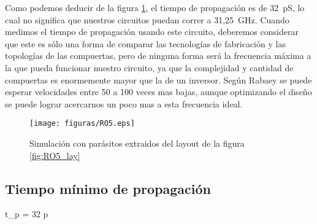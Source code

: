 Como podemos deducir de la figura \ref{fig:RO5_wf}, el tiempo de propagación es de 32~pS, lo cual no significa que nuestros circuitos puedan correr a 31,25~GHz. Cuando medimos el tiempo de propagación usando este circuito, deberemos considerar que este es sólo una forma de comparar las tecnologías de fabricación y las topologías de las compuertas, pero de ninguna forma será la frecuencia máxima a la que pueda funcionar nuestro circuito, ya que la complejidad y cantidad de compuertas es enormemente mayor que la de un inversor. Según Rabaey\cite{rabaey2003} se puede esperar velocidades entre 50 a 100 veces mas bajas, aunque optimizando el diseño se puede lograr acercarnos un poco mas a esta frecuencia ideal. 

\begin{figure}[h!]
\vspace{-5pt}
  \centering
\texttt{[image: figuras/RO5.eps]}
  \caption{Simulación con parásitos extraidos del layout de la figura \ref{fig:RO5_lay}}
\label{fig:RO5_wf}
\vspace{-10pt}
\end{figure}


\subsection{Tiempo mínimo de propagación}
t_p = 32 p



